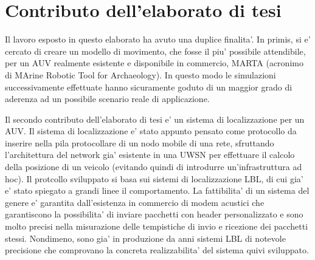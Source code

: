 \section{Contributo dell'elaborato di tesi}
Il lavoro esposto in questo elaborato ha avuto una duplice finalita'.
In primis, si e' cercato di creare un modello di movimento, che fosse il piu' possibile attendibile, per un AUV realmente esistente e disponibile in commercio, MARTA (acronimo di MArine Robotic Tool for Archaeology). In questo modo le simulazioni successivamente effettuate hanno sicuramente goduto di un maggior grado di aderenza ad un possibile scenario reale di applicazione.
\par
Il secondo contributo dell'elaborato di tesi e' un sistema di localizzazione per un AUV.
Il sistema di localizzazione e' stato appunto pensato come protocollo da inserire nella pila protocollare di un nodo mobile di una rete, sfruttando l'architettura del network gia' esistente in una UWSN per effettuare il calcolo della posizione di un veicolo (evitando quindi di introdurre un'infrastruttura ad hoc).
Il protcollo sviluppato si basa sui sistemi di localizzazione LBL, di cui gia' e' stato spiegato a grandi linee il comportamento. La fattibilita' di un sistema del genere e' garantita dall'esistenza in commercio di modem acustici che garantiscono la possibilita' di inviare pacchetti con header personalizzato e sono molto precisi nella misurazione delle tempistiche di invio e ricezione dei pacchetti stessi. Nondimeno, sono gia' in produzione da anni sistemi LBL di notevole precisione \cite{lblsonardyne} che comprovano la concreta realizzabilita' del sistema quivi sviluppato.